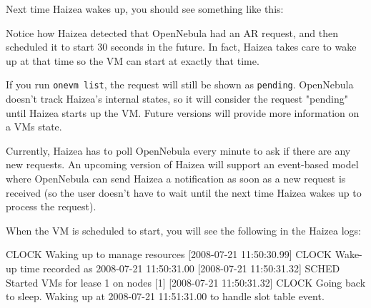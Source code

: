 Next time Haizea wakes up, you should see something like this:


Notice how Haizea detected that OpenNebula had an AR request, and then scheduled it to start 30 seconds in the future. In fact, Haizea takes care to wake up at that time so the VM can start at exactly that time.

\begin{warning}
If you run \texttt{onevm list}, the request will still be shown as \texttt{pending}. OpenNebula doesn't track Haizea's internal states, so it will consider the request "pending" until Haizea starts up the VM. Future versions will provide more information on a VMs state.
\end{warning}

\begin{warning}
Currently, Haizea has to poll OpenNebula every minute to ask if there are any new requests. An upcoming version of Haizea will support an event-based model where OpenNebula can send Haizea a notification as soon as a new request is received (so the user doesn't have to wait until the next time Haizea wakes up to process the request).
\end{warning}

When the VM is scheduled to start, you will see the following in the Haizea logs:

\begin{wideshellverbatim}
[2008-07-21 11:50:30.99] CLOCK   Waking up to manage resources
[2008-07-21 11:50:30.99] CLOCK   Wake-up time recorded as 2008-07-21 11:50:31.00
[2008-07-21 11:50:31.32] SCHED   Started VMs for lease 1 on nodes [1]
[2008-07-21 11:50:31.32] CLOCK   Going back to sleep. 
                                 Waking up at 2008-07-21 11:51:31.00 
                                 to handle slot table event.
\end{wideshellverbatim}

